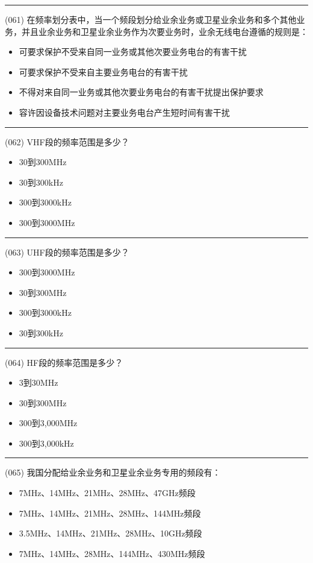 \documentclass[twocolumn]{ctexart}  %
\begin{document}
\noindent\rule{0.5\textwidth}{1pt}
\heiti (061) 在频率划分表中，当一个频段划分给业余业务或卫星业余业务和多个其他业务，并且业余业务和卫星业余业务作为次要业务时，业余无线电台遵循的规则是： \songti {\color{gray} [LK0143] }
\begin{itemize}
	\item  可要求保护不受来自同一业务或其他次要业务电台的有害干扰
	\item  可要求保护不受来自主要业务电台的有害干扰
	\item  不得对来自同一业务或其他次要业务电台的有害干扰提出保护要求
	\item  容许因设备技术问题对主要业务电台产生短时间有害干扰
\end{itemize}


\noindent\rule{0.5\textwidth}{1pt}
\heiti (062) VHF段的频率范围是多少？ \songti {\color{gray} [LK1112] }
\begin{itemize}
	\item  30到300MHz
	\item  30到300kHz
	\item  300到3000kHz
	\item  300到3000MHz
\end{itemize}


\noindent\rule{0.5\textwidth}{1pt}
\heiti (063) UHF段的频率范围是多少？ \songti {\color{gray} [LK1113] }
\begin{itemize}
	\item  300到3000MHz
	\item  30到300MHz
	\item  300到3000kHz
	\item  30到300kHz
\end{itemize}


\noindent\rule{0.5\textwidth}{1pt}
\heiti (064) HF段的频率范围是多少？ \songti {\color{gray} [LK1114] }
\begin{itemize}
	\item  3到30MHz
	\item  30到300MHz
	\item  300到3,000MHz
	\item  300到3,000kHz
\end{itemize}


\noindent\rule{0.5\textwidth}{1pt}
\heiti (065) 我国分配给业余业务和卫星业余业务专用的频段有： \songti {\color{gray} [LK0144] }
\begin{itemize}
	\item  7MHz、14MHz、21MHz、28MHz、47GHz频段
	\item  7MHz、14MHz、21MHz、28MHz、144MHz频段
	\item  3.5MHz、14MHz、21MHz、28MHz、10GHz频段
	\item  7MHz、14MHz、28MHz、144MHz、430MHz频段
\end{itemize}
\end{document}

